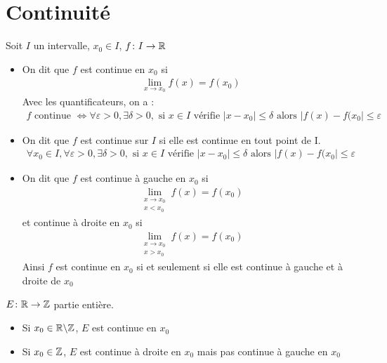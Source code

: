 \section{Continuité}
\begin{graybox}
\begin{definition}
Soit $I$ un intervalle, $x_0 \in I$, $f \colon I \to \mathbb{R}$
\begin{itemize}
\item On dit que $f$ est continue en $x_0$ si 
\begin{align*}
\lim_{x \to x_0} f(x) = f(x_0)
\end{align*}
Avec les quantificateurs, on a :
\begin{align*}
f \text{ continue } \iff \forall \varepsilon > 0, \exists \delta > 0, \text{ si } x \in I \text{ vérifie } |x - x_0 | \leq \delta \text{ alors } |f(x) - f(x_0| \leq \varepsilon
\end{align*}
\item On dit que $f$ est continue sur $I$ si elle est continue en tout point de I.
\begin{align*}
\forall x_0 \in I, \forall \varepsilon > 0, \exists \delta > 0, \text{ si } x \in I \text{ vérifie } |x - x_0| \leq \delta \text{ alors } |f(x) - f(x_0| \leq \varepsilon
\end{align*}
\item On dit que $f$ est continue à gauche en $x_0$ si 
\begin{align*}
\lim_{\substack{x \to x_0 \\ x < x_0}} f(x) = f(x_0)
\end{align*}
et continue à droite en $x_0$ si
\begin{align*}
\lim_{\substack{x \to x_0 \\ x > x_0}} f(x) = f(x_0)
\end{align*}
Ainsi $f$ est continue en $x_0$ si et seulement si elle est continue à gauche et à droite de $x_0$
\end{itemize}
\end{definition} 
\end{graybox}

\begin{exemple}
$E \colon \mathbb{R} \to \mathbb{Z}$ partie entière.
\begin{itemize}
\item Si $x_0 \in \mathbb{R} \backslash \mathbb{Z}$, $E$ est continue en $x_0$
\item Si $x_0 \in \mathbb{Z}$, $E$ est continue à droite en $x_0$ mais pas continue à gauche en $x_0$
\end{itemize}
\end{exemple}

